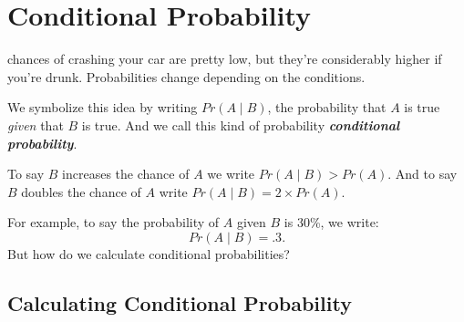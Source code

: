 \documentclass[justified]{tufte-book}
\newcommand{\given}{\mid}
\newcommand{\gt}{>}
\newcommand{\p}{Pr}
\theoremstyle{definition}
\theoremstyle{definition}
\theoremstyle{definition}
\theoremstyle{remark}
\begin{document}
\hypertarget{conditional-probability}{%
\chapter{Conditional Probability}\label{conditional-probability}}

 chances of crashing your car are pretty low, but
they're considerably higher if you're drunk. Probabilities change
depending on the conditions.

We symbolize this idea by writing \(\p(A \given B)\), the probability
that \(A\) is true \emph{given} that \(B\) is true. And we call this
kind of probability \textbf{\emph{conditional probability}}.

\begin{marginfigure}
To say \(B\) increases the chance of \(A\) we write
\(\p(A \given B) \gt \p(A)\). And to say \(B\) doubles the chance of
\(A\) write \(\p(A \given B) = 2 \times \p(A)\).
\end{marginfigure}

For example, to say the probability of \(A\) given \(B\) is 30\%, we
write: \[ \p(A \given B) = .3. \] But how do we calculate conditional
probabilities?

\hypertarget{calculating-conditional-probability}{%
\section{Calculating Conditional
Probability}\label{calculating-conditional-probability}}
\end{document}
